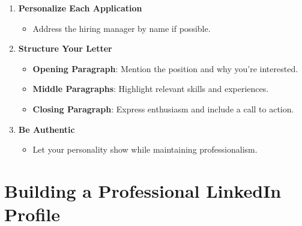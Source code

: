 \documentclass[
  letterpaper,
  DIV=11,
  numbers=noendperiod]{scrreprt}
\providecommand{\tightlist}{%
  \setlength{\itemsep}{0pt}\setlength{\parskip}{0pt}}\usepackage{longtable,booktabs,array}
\begin{document}
\begin{enumerate}
\def\labelenumi{\arabic{enumi}.}
\item
  \textbf{Personalize Each Application}

  \begin{itemize}
  \tightlist
  \item
    Address the hiring manager by name if possible.
  \end{itemize}
\item
  \textbf{Structure Your Letter}

  \begin{itemize}
  \tightlist
  \item
    \textbf{Opening Paragraph}: Mention the position and why you're
    interested.
  \item
    \textbf{Middle Paragraphs}: Highlight relevant skills and
    experiences.
  \item
    \textbf{Closing Paragraph}: Express enthusiasm and include a call to
    action.
  \end{itemize}
\item
  \textbf{Be Authentic}

  \begin{itemize}
  \tightlist
  \item
    Let your personality show while maintaining professionalism.
  \end{itemize}
\end{enumerate}

\section{Building a Professional LinkedIn
Profile}\label{building-a-professional-linkedin-profile}
\end{document}
